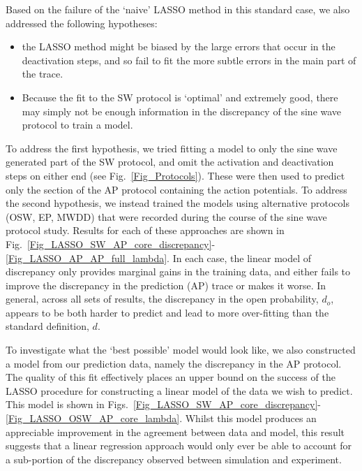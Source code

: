 \documentclass[11pt,a4paper,oneside]{article}
\begin{document}
\clearpage

Based on the failure of the `naive' LASSO method in this standard case, we also addressed the following hypotheses:
\begin{itemize}
\item the LASSO method might be biased by the large errors that occur in the deactivation steps, and so fail to fit the more subtle errors in the main part of the trace.
\item Because the fit to the SW protocol is `optimal' and  extremely good, there may simply not be enough information in the discrepancy of the sine wave protocol to train a model.
\end{itemize}

To address the first hypothesis, we tried fitting a model to only the sine wave generated part of the SW protocol, and omit the activation and deactivation steps on either end (see Fig.~\ref{Fig_Protocols}). These were then used to predict only the section of the AP protocol containing the action potentials. To address the second hypothesis, we instead trained the models using alternative protocols (OSW, EP, MWDD) that were recorded during the course of the sine wave protocol study. Results for each of these approaches are shown in Fig.~\ref{Fig_LASSO_SW_AP_core_discrepancy}-\ref{Fig_LASSO_AP_AP_full_lambda}. In each case, the linear model of discrepancy only provides marginal gains in the training data, and either fails to improve the discrepancy in the prediction (AP) trace or makes it worse. In general, across all sets of results, the discrepancy in the open probability, $d_o$, appears to be both harder to predict and lead to more over-fitting than the standard definition, $d$.

To investigate what the `best possible' model would look like, we also constructed a model from our prediction data, namely the discrepancy in the AP protocol. The quality of this fit effectively places an upper bound on the success of the LASSO procedure for constructing a linear model of the data we wish to predict. This model is shown in Figs.~\ref{Fig_LASSO_SW_AP_core_discrepancy}-\ref{Fig_LASSO_OSW_AP_core_lambda}. Whilst this model produces an appreciable improvement in the agreement between data and model, this result suggests that a linear regression approach would only ever be able to account for a sub-portion of the discrepancy observed between simulation and experiment.
\end{document}
